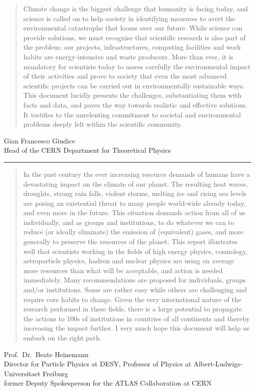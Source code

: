 \documentclass[../SustainableHEP.tex]{subfiles}
\begin{document}
\begin{quotation}
Climate change is the biggest challenge that humanity is facing today, and science is called on to help society in identifying measures to avert the environmental catastrophe that looms over our future. While science can provide solutions, we must recognise that scientific research is also part of the problem: our projects, infrastructures, computing facilities and work habits are energy-intensive and waste producers. More than ever, it is mandatory for scientists today to assess carefully the environmental impact of their activities and prove to society that even the most advanced scientific projects can be carried out in environmentally sustainable ways. This document lucidly presents the challenges, substantiating them with facts and data, and paves the way towards realistic and effective solutions. It testifies to the unrelenting commitment to societal and environmental problems deeply felt within the scientific community.
\end{quotation}
\begin{flushleft}
Gian Francesco Giudice\\
Head of the CERN Department for Theoretical Physics\\
\end{flushleft}

\textcolor{Pythongreen}{\rule{2cm}{3pt}}

\begin{quotation}
In the past century the ever increasing resource demands of humans have a devastating impact on the climate of our planet. The resulting heat waves, droughts, strong rain falls, violent storms, melting ice and rising sea levels are posing an existential threat to many people world-wide already today, and even more in the future. This situation demands action from all of us individually, and as groups and institutions, to do whatever we can to reduce (or ideally eliminate) the emission of \CdO  (equivalent) gases, and more generally to preserve the resources of the planet. This report illustrates well that scientists working in the fields of high energy physics, cosmology, astroparticle physics, hadron and nuclear physics are using on average more resources than what will be acceptable, and action is needed immediately. Many recommendations are proposed for individuals, groups and/or institutions. Some are rather easy while others are challenging and require core habits to change. Given the very international nature of the research performed in these fields, there is a large potential to propagate the actions to 100s of institutions in countries of all continents and thereby increasing the impact further. I very much hope this document will help us embark on the right path.
\end{quotation}
\begin{flushleft}
Prof.~Dr.~Beate Heinemann\\
Director for Particle Physics at DESY, Professor of Physics at Albert-Ludwigs-Universitaet Freiburg\\
former Deputy Spokesperson for the ATLAS Collaboration at CERN
\end{flushleft}
\end{document}
